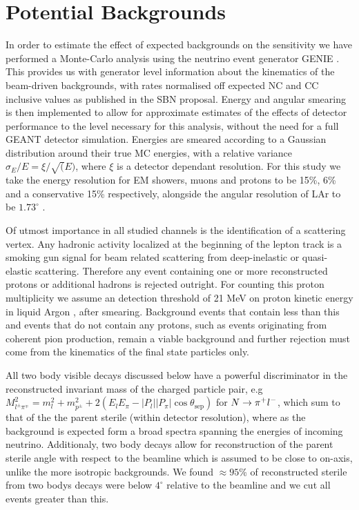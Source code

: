 \documentclass[11pt, a4paper]{article}
\def\ster{\ensuremath N}
\begin{document}
\section{Potential Backgrounds\label{app:bg}}
In order to estimate the effect of expected backgrounds on the sensitivity we
have performed a Monte-Carlo analysis using the neutrino event generator GENIE
\cite{Andreopoulos:2009rq}. This provides us with generator level information about the
kinematics of the beam-driven backgrounds, with rates normalised off expected
NC and CC inclusive values as published in the SBN proposal. Energy and angular
smearing is then implemented to allow for approximate estimates of the effects
of detector performance to the level necessary for this analysis, without the
need for a full GEANT detector simulation. Energies are smeared according to a
Gaussian distribution around their true MC energies, with a relative variance
$\sigma_E/E = \xi/ \sqrt(E) $, where $\xi$ is a detector dependant resolution.
For this study we take the energy resolution for EM showers, muons and protons
to be 15\%, 6\% and a conservative 15\% respectively, alongside the angular
resolution of LAr to be $1.73^{\circ}$ \cite{Antonello:2015lea}. 

Of utmost importance in all studied channels is the identification of a scattering vertex. Any hadronic activity
localized at the beginning of the lepton track is a smoking gun signal for beam
related scattering from deep-inelastic or quasi-elastic scattering. Therefore
any event containing one or more reconstructed protons or additional hadrons is
rejected outright. For counting this proton multiplicity we assume an detection
threshold of 21 MeV on proton kinetic energy in liquid Argon \cite{Acciarri:2014gev}, after smearing.
Background events that contain less than this and events that do not contain
any protons, such as events originating from coherent pion production, remain a
viable background and further rejection must come from the kinematics of the
final state particles only.

All two body visible decays discussed below have a powerful discriminator in
the reconstructed invariant mass of the charged particle pair, e.g  $M_{l^\pm
\pi^\mp}^2=m_l^2+m_{p^\pm}^2+ 2(E_l E_\pi - |P_l||P_\pi|\cos\theta_\text{sep})$
for $\ster\rightarrow \pi^+ l^-$, which sum to that of the the parent sterile
(within detector resolution), where as the background is expected form a broad
spectra spanning the energies of incoming neutrino. Additionaly, two body
decays allow for reconstruction of the parent sterile angle with respect to the
beamline which is assumed to be close to on-axis, unlike the more isotropic
backgrounds. We found $\approx 95$\% of reconstructed sterile from two bodys
decays were below $4^\circ$ relative to the beamline and we cut all events
greater than this. 
\end{document}
